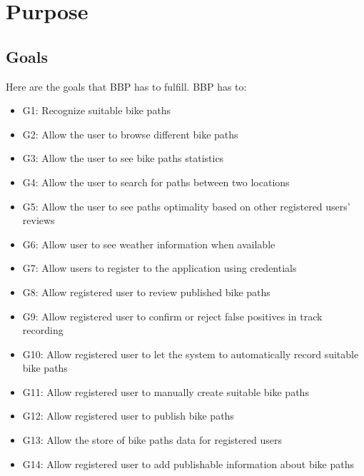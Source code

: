 \section{Purpose}
\subsection{Goals}
Here are the goals that BBP has to fulfill. BBP has to:
\begin{itemize}
	\item G1: Recognize suitable bike paths
	\item G2: Allow the user to browse different bike paths
	\item G3: Allow the user to see bike paths statistics
	\item G4: Allow the user to search for paths between two locations
	\item G5: Allow the user to see paths optimality based on other registered users' reviews	
	\item G6: Allow user to see weather information when available
	
	\item G7: Allow users to register to the application using credentials
	\item G8: Allow registered user to review published bike paths	
	\item G9: Allow registered user to confirm or reject false positives in track recording
	\item G10: Allow registered user to let the system to automatically record suitable bike paths
	\item G11: Allow registered user to manually create suitable bike paths 
	\item G12: Allow registered user to publish bike paths
	\item G13: Allow the store of bike paths data for registered users
	\item G14: Allow registered user to add publishable information about bike paths
	
	
	
\end{itemize}